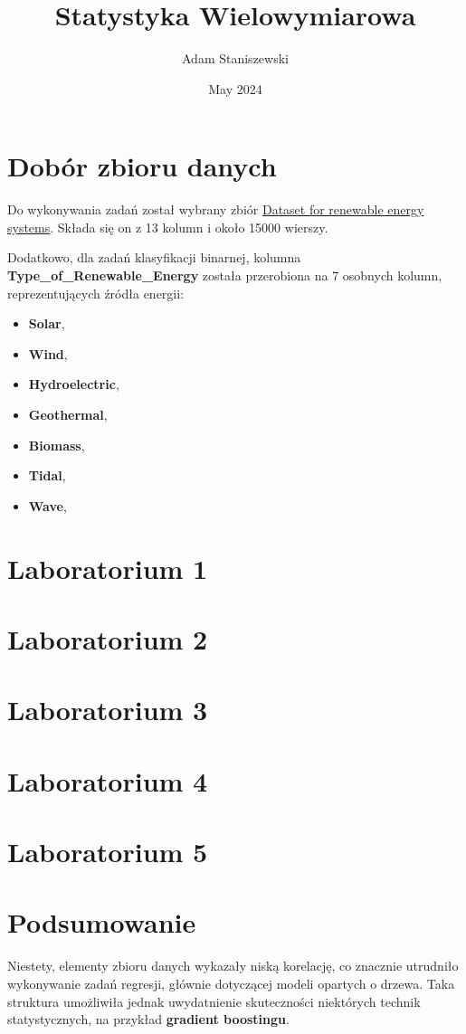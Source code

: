 \documentclass{article}
\title{Statystyka Wielowymiarowa}
\author{Adam Staniszewski}
\date{May 2024}
\begin{document}
\maketitle

\tableofcontents  %

\section{Dobór zbioru danych}
Do wykonywania zadań został wybrany zbiór \href{https://www.kaggle.com/datasets/girumwondemagegn/dataset-for-renewable-energy-systems}{Dataset for renewable energy systems}. Składa się on z 13 kolumn i około 15000 wierszy. 

Dodatkowo, dla zadań klasyfikacji binarnej, kolumna \textbf{Type\_of\_Renewable\_Energy} została przerobiona na 7 osobnych kolumn, reprezentujących źródła energii:
\begin{itemize}
    \item \textbf{Solar},
    \item \textbf{Wind},
    \item \textbf{Hydroelectric},
    \item \textbf{Geothermal},
    \item \textbf{Biomass},
    \item \textbf{Tidal},
    \item \textbf{Wave},
\end{itemize}

\section{Laboratorium 1}


\section{Laboratorium 2}


\section{Laboratorium 3}


\section{Laboratorium 4}


\section{Laboratorium 5}


\section{Podsumowanie}
Niestety, elementy zbioru danych wykazały niską korelację, co znacznie utrudniło wykonywanie zadań regresji, głównie dotyczącej modeli opartych o drzewa. Taka struktura umożliwiła jednak uwydatnienie skuteczności niektórych technik statystycznych, na przykład \textbf{gradient boostingu}.
\end{document}
